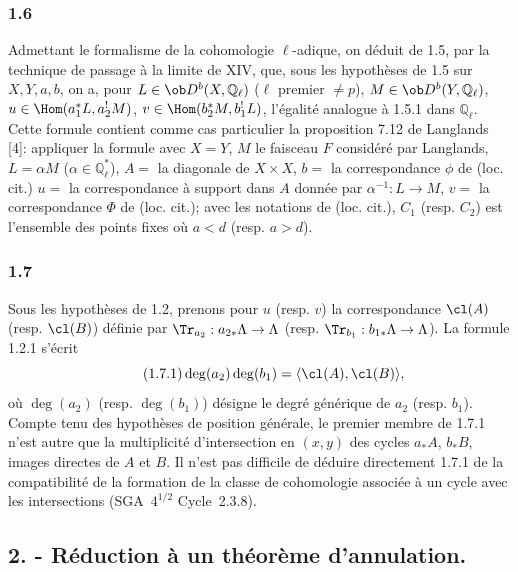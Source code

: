 \subsubsection*{1.6}
Admettant le formalisme de la cohomologie $\ell$-adique, on déduit de 1.5, par la technique de passage à la limite de XIV, que, sous les hypothèses de 1.5 sur $X,Y,a,b$, on a, pour $L\in\ob D^b(X,\mathbb{Q}_\ell)$ ($\ell$ premier $\ne p$), $M\in\ob D^b(Y,\mathbb{Q}_\ell)$, $u\in\Hom(a_1^*L,a_2^!M)$, $v\in\Hom(b_2^*M,b_1^!L)$, l'égalité analogue à 1.5.1 dans $\mathbb{Q}_\ell$. Cette formule contient comme cas particulier la proposition 7.12 de Langlands [4]: appliquer la formule avec $X=Y$, $M$ le faisceau $F$ considéré par Langlands, $L=\alpha M$ ($\alpha\in\mathbb{Q}_\ell^*$), $A=$ la diagonale de $X\times X$, $b=$ la correspondance $\phi$ de (loc. cit.) 
$u=$ la
correspondance à support dans $A$ donnée par $\alpha^{-1}:L\to M$, $v=$ la correspondance $\Phi$ de (loc. cit.); avec les notations de (loc. cit.), $C_1$ (resp. $C_2$) est l'ensemble des points fixes où $a<d$ (resp. $a>d$).

\subsubsection*{1.7}
Sous les hypothèses de 1.2, prenons pour $u$ (resp. $v$) la correspondance $\cl(A)$ (resp. $\cl(B)$) définie par $\Tr_{a_2}:a_{2*}\Lambda\to\Lambda$ (resp. $\Tr_{b_1}:b_{1*}\Lambda\to\Lambda$). La formule 1.2.1 s'écrit
\begin{equation}\tag{1.7.1}
\deg(a_2)\deg(b_1)=\langle \cl(A),\cl(B)\rangle,
\end{equation}
où $\deg(a_2)$ (resp. $\deg(b_1)$) désigne le degré générique de $a_2$ (resp. $b_1$). Compte tenu des hypothèses de position générale, le premier membre de 1.7.1 n'est autre que la multiplicité d'intersection en $(x,y)$ des cycles $a_*A$, $b_*B$, images directes de $A$ et $B$. Il n'est pas difficile de déduire directement 1.7.1 de la compatibilité de la formation de la classe de cohomologie associée à un cycle avec les intersections (SGA~$4^{1/2}$ Cycle~2.3.8).


\subsection*{2. - Réduction à un théorème d'annulation.}

